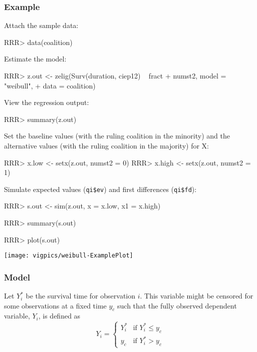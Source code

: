 \subsubsection{Example}

Attach the sample data: 
\begin{Schunk}
\begin{Sinput}
RRR>  data(coalition)
\end{Sinput}
\end{Schunk}
Estimate the model: 
\begin{Schunk}
\begin{Sinput}
RRR>  z.out <- zelig(Surv(duration, ciep12) ~ fract + numst2, model = "weibull",
+                  data = coalition)
\end{Sinput}
\end{Schunk}
View the regression output:  
\begin{Schunk}
\begin{Sinput}
RRR>  summary(z.out)
\end{Sinput}
\end{Schunk}
Set the baseline values (with the ruling coalition in the minority)
and the alternative values (with the ruling coalition in the majority)
for X:
\begin{Schunk}
\begin{Sinput}
RRR>  x.low <- setx(z.out, numst2 = 0)
RRR>  x.high <- setx(z.out, numst2 = 1)
\end{Sinput}
\end{Schunk}
Simulate expected values ({\tt qi\$ev}) and first differences ({\tt qi\$fd}):
\begin{Schunk}
\begin{Sinput}
RRR>  s.out <- sim(z.out, x = x.low, x1 = x.high)
\end{Sinput}
\end{Schunk}
\begin{Schunk}
\begin{Sinput}
RRR>  summary(s.out)
\end{Sinput}
\end{Schunk}
\begin{center}
\begin{Schunk}
\begin{Sinput}
RRR> plot(s.out)
\end{Sinput}
\end{Schunk}
\texttt{[image: vigpics/weibull-ExamplePlot]}
\end{center}

\subsubsection{Model}
Let $Y_i^*$ be the survival time for observation $i$. This variable
might be censored for some observations at a fixed time $y_c$ such
that the fully observed dependent variable, $Y_i$, is defined as
\begin{equation*}
  Y_i = \left\{ \begin{array}{ll}
      Y_i^* & \textrm{if }Y_i^* \leq y_c \\
      y_c & \textrm{if }Y_i^* > y_c 
    \end{array} \right.
\end{equation*}

